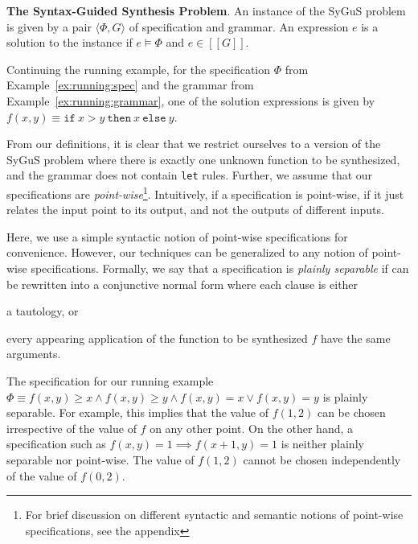 \documentclass{llncs}
\newcommand\tuple[1]{\langle #1 \rangle}
\newcommand\Expr{e}
\newcommand\Spec{\Phi}
\newcommand\Grammar{G}
\newcommand\sem[1]{[\![ #1 ]\!]}
\newcommand\SynthFun{f}
\renewcommand{\paragraph}[1]{\par\noindent\textbf{#1}.}
\begin{document}
\paragraph{The Syntax-Guided Synthesis Problem}
An instance of the SyGuS problem is given by a pair $\tuple { \Spec,
\Grammar }$ of specification and grammar.
An expression $\Expr$ is a solution to the instance if $\Expr \models
\Spec$ and $\Expr \in \sem{\Grammar}$.

\begin{example}
  Continuing the running example, for the specification $\Spec$ from
  Example~\ref{ex:running:spec} and the grammar from
  Example~\ref{ex:running:grammar}, one of the solution expressions is
  given by $\SynthFun(x, y) \equiv \mathtt{if}~x > y~\mathtt{then}~x~\mathtt{else}~y$.
\end{example}

From our definitions, it is clear that we restrict ourselves to a
version of the SyGuS problem where there is exactly one unknown function
to be synthesized, and the grammar does not contain {\tt let} rules.
Further, we assume that our specifications are {\em
  point-wise}\footnote{For brief discussion on different syntactic and
semantic notions of point-wise specifications, see the appendix}.
Intuitively, if a specification is point-wise, if it just relates the
input point to its output, and not the outputs of different inputs.

Here, we use a simple syntactic notion of point-wise specifications for
convenience.
However, our techniques can be generalized to any notion of point-wise
specifications.
Formally, we say that a specification is {\em plainly separable} if can
be rewritten into a conjunctive normal form where each clause is either
\begin{inparaenum}[(a)]
\item a tautology, or
\item every appearing application of the function to be synthesized
  $\SynthFun$ have the same arguments.
\end{inparaenum}

\begin{example}
  The specification for our running example $\Spec \equiv \SynthFun(x,
  y) \geq x \wedge \SynthFun(x, y) \geq y \wedge \SynthFun(x, y) = x
  \vee \SynthFun(x, y) = y$ is plainly separable.
  For example, this implies that the value of $\SynthFun(1, 2)$ can be
  chosen irrespective of the value of $\SynthFun$ on any other point.
  On the other hand, a specification such as $\SynthFun(x, y) = 1
  \implies \SynthFun(x + 1, y) = 1$ is neither plainly separable nor
  point-wise.
  The value of $\SynthFun(1, 2)$ cannot be chosen independently of the
  value of $\SynthFun(0, 2)$.
\end{example}
\end{document}
